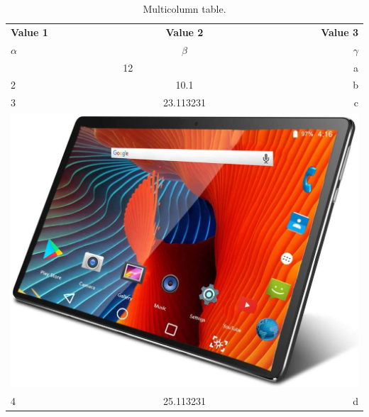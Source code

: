 \documentclass{article}
\begin{document}
	\begin{table}[h!]
		\begin{center}
			\caption{Multicolumn table.}
			\label{tab:table1}
			\begin{tabular}{| l | c | r |}
				\hline
				\textbf{Value 1} & \textbf{Value 2 } & \textbf{Value 3}\\
				$\alpha$ & $\beta$ & $\gamma$\\
				\hline
				\multicolumn{2}{|c|}{12} & a\\
				\hline
				2 & 10.1 & b\\
				3 & 23.113231 & c\\
				\hline
				\multicolumn{3}{|c|}{\includegraphics[width=0.15\linewidth]{productimg.jpeg}}\\
				\hline
				4 & 25.113231 & d\\
				\hline
				\end{tabular}
				
		\end{center}
	\end{table}
\end{document}
